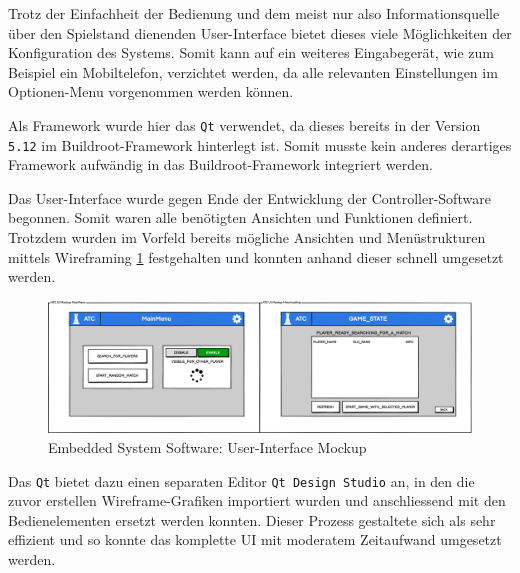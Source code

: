 Trotz der Einfachheit der Bedienung und dem meist nur also
Informationsquelle über den Spielstand dienenden User-Interface bietet
dieses viele Möglichkeiten der Konfiguration des Systems. Somit kann auf
ein weiteres Eingabegerät, wie zum Beispiel ein Mobiltelefon, verzichtet
werden, da alle relevanten Einstellungen im Optionen-Menu vorgenommen
werden können.

Als Framework wurde hier das
\passthrough{\lstinline!Qt!}\cite{qtframework} verwendet, da dieses
bereits in der Version \passthrough{\lstinline!5.12!} im
Buildroot-Framework hinterlegt ist. Somit musste kein anderes derartiges
Framework aufwändig in das Buildroot-Framework integriert werden.

Das User-Interface wurde gegen Ende der Entwicklung der
Controller-Software begonnen. Somit waren alle benötigten Ansichten und
Funktionen definiert. Trotzdem wurden im Vorfeld bereits mögliche
Ansichten und Menüstrukturen mittels Wireframing \ref{ATC_Gui}
festgehalten und konnten anhand dieser schnell umgesetzt werden.

\begin{figure}
\centering
\includegraphics{images/ATC_Gui.png}
\caption{Embedded System Software: User-Interface Mockup
\label{ATC_Gui}}
\end{figure}

Das \passthrough{\lstinline!Qt!} bietet dazu einen separaten Editor
\passthrough{\lstinline!Qt Design Studio!} an, in den die zuvor
erstellen Wireframe-Grafiken importiert wurden und anschliessend mit den
Bedienelementen ersetzt werden konnten. Dieser Prozess gestaltete sich
als sehr effizient und so konnte das komplette UI mit moderatem
Zeitaufwand umgesetzt werden.

